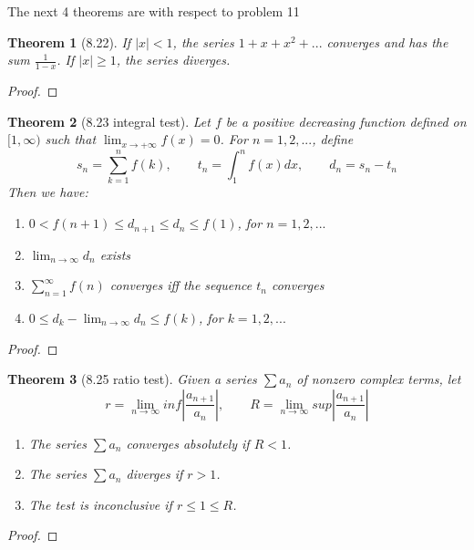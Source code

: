 \documentclass[aps,pra,notitlepage,amsmath,amssymb,letterpaper,12pt]{revtex4-1}
\newtheorem{theorem}{Theorem}
\begin{document}
The next 4 theorems are with respect to problem 11
\begin{theorem}[8.22]
If $|x| < 1$, the series $1 + x + x^2 + ... $  converges and has the sum $\frac{1}{1-x}$. If $|x| \geq 1$, the series diverges.
\end{theorem}
\begin{proof}
\end{proof}

\begin{theorem}[8.23 integral test]
Let $f$ be a positive decreasing function defined on $[1, \infty)$ such that $\lim_{x \to +\infty}f(x) = 0$. For $n = 1,2,...$, define
\[s_{n} = \sum_{k=1}^{n}f(k), \qquad  t_{n} = \int_{1}^{n}f(x)dx,  \qquad  d_{n}=s_{n}-t_{n}\]
Then we have:
\begin{enumerate}[\upshape a)]
  \item $0 < f(n+1) \leq d_{n+1} \leq d_{n} \leq f(1)$, \qquad for  $n=1,2,...$
  \item $\lim_{n \to \infty}d_{n}$ exists
  \item $\sum_{n=1}^{\infty}f(n)$ converges iff the sequence ${t_{n}}$ converges
  \item $0 \leq d_{k}-\lim_{n \to \infty}d_{n} \leq f(k)$, \qquad for $k=1,2,...$
\end{enumerate}
\end{theorem}
\begin{proof}
\end{proof}

\begin{theorem}[8.25 ratio test]
Given a series $\sum a_{n}$ of nonzero complex terms, let
\[r = \lim_{n \to \infty} inf \left| \frac{a_{n+1}}{a_{n}}\right|, \qquad R = \lim_{n \to \infty} sup \left| \frac{a_{n+1}}{a_{n}}\right|\]
\begin{enumerate}[\upshape a)]
  \item The series $\sum a_{n}$ converges absolutely if $R < 1$.
  \item The series $\sum a_{n}$ diverges if $r>1$.
  \item The test is inconclusive if $r \leq 1 \leq R$.
\end{enumerate}
\end{theorem}
\begin{proof}
\end{proof}
\end{document}
